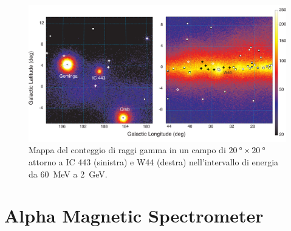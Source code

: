 \documentclass[utf8,9pt]{beamer}
\begin{document}
\begin{frame}
  \frametitle{}
  \begin{figure}
    \centering
    \includegraphics[width=0.8\columnwidth]{1231160fig1.pdf}
    \caption{Mappa del conteggio di raggi gamma in un campo di
      $\SI{20}{\degree} \times \SI{20}{\degree}$ attorno a IC 443 (sinistra) e
      W44 (destra) nell'intervallo di energia da \SI{60}{\mega\electronvolt} a
      \SI{2}{\giga\electronvolt}.}
  \end{figure}
\end{frame}

\section[AMS]{Alpha Magnetic Spectrometer}

\begin{frame}
  \frametitle{}
  
\end{frame}
\end{document}
